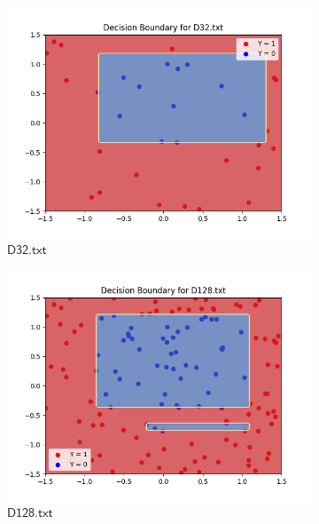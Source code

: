 \documentclass[a4paper]{article}
\theoremstyle{definition}
\newenvironment{soln}{
    \leavevmode\color{blue}\ignorespaces
}{}
\begin{document}
\begin{enumerate}
\begin{soln}
    \begin{figure}[h]
          \centering
          \begin{subfigure}{0.5\textwidth}
          \centering
          \includegraphics[width=1.1\linewidth]{Decision_Boundary_D32.png}
          \caption{$\mathsf{D32.txt}$}
          \label{fig:7sub1}
        \end{subfigure}%
        \begin{subfigure}{0.5\textwidth}
          \centering
          \includegraphics[width=1.1\linewidth]{Decision_Boundary_D128.png}
          \caption{$\mathsf{D128.txt}$}
          \label{fig:7sub2}
          \end{subfigure}
          \begin{subfigure}{0.5\textwidth}

\end{subfigure}
\end{figure}
\end{soln}
\end{enumerate}
\end{document}
